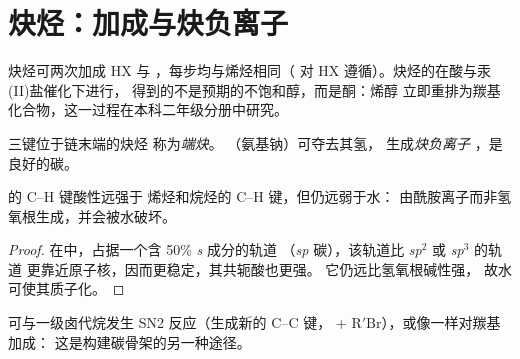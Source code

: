 \section{炔烃：加成与炔负离子}

炔烃可两次加成 HX 与 ，每步均与烯烃相同（
对 HX 遵循）。炔烃的在酸与汞(II)盐催化下进行，
得到的不是预期的不饱和醇，而是酮：烯醇
立即重排为羰基化合物，这一过程在本科二年级分册中研究。

\begin{definition}[端炔、炔负离子]\label{def:b1:electrophilic-additions:acetylide}
三键位于链末端的炔烃  称为\emph{端炔}。
（氨基钠）可夺去其氢，
生成\emph{炔负离子}
，是良好的碳。
\end{definition}

\begin{proposition}[端炔的酸性]\label{prop:b1:electrophilic-additions:acetylide-acidity}
的 C--H 键酸性远强于
烯烃和烷烃的 C--H 键，但仍远弱于水：
由酰胺离子而非氢氧根生成，并会被水破坏。
\end{proposition}

\begin{proof}
在中，占据一个含 50\% \textit{s} 成分的轨道
（\textit{sp} 碳），该轨道比 \textit{sp}$^2$ 或 \textit{sp}$^3$ 的轨道
更靠近原子核，因而更稳定，其共轭酸也更强。
它仍远比氢氧根碱性强，
故水可使其质子化。
\end{proof}

可与一级卤代烷发生 SN2 反应（生成新的 C--C 键，
 + $\mathrm{R'Br}$），或像一样对羰基加成：
这是构建碳骨架的另一种途径。

